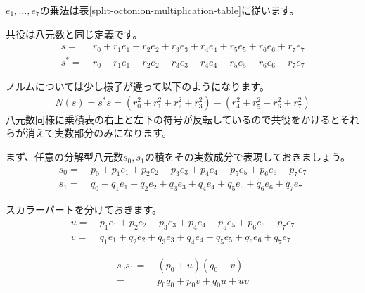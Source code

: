 \documentclass[a4paper,12pt,notitlepage]{jsreport}
\begin{document}
$e_1,...,e_7$の乗法は表\ref{split-octonion-multiplication-table}に従います。

共役は八元数と同じ定義です。
\begin{equation}
\begin{split}
s=~&r_0+r_1e_1+r_2e_2+r_3e_3+r_4e_4+r_5e_5+r_6e_6+r_7e_7\\
s^*=~&r_0-r_1e_1-r_2e_2-r_3e_3-r_4e_4-r_5e_5-r_6e_6-r_7e_7
\end{split}
\end{equation}

ノルムについては少し様子が違って以下のようになります。
\begin{equation}
\begin{split}
N(s)=s^*s=(r_0^2+r_1^2+r_2^2+r_3^2)-(r_4^2+r_5^2+r_6^2+r_7^2)
\end{split}
\end{equation}
八元数同様に乗積表の右上と左下の符号が反転しているので共役をかけるとそれらが消えて実数部分のみになります。

まず、任意の分解型八元数$s_0,s_1$の積をその実数成分で表現しておきましょう。
\begin{equation}
\begin{split}
s_0=~&p_0+p_1e_1+p_2e_2+p_3e_3+p_4e_4+p_5e_5+p_6e_6+p_7e_7\\
s_1=~&q_0+q_1e_1+q_2e_2+q_3e_3+q_4e_4+q_5e_5+q_6e_6+q_7e_7
\end{split}
\end{equation}

スカラーパートを分けておきます。
\begin{equation}
\begin{split}
u=~&p_1e_1+p_2e_2+p_3e_3+p_4e_4+p_5e_5+p_6e_6+p_7e_7\\
v=~&q_1e_1+q_2e_2+q_3e_3+q_4e_4+q_5e_5+q_6e_6+q_7e_7
\end{split}
\end{equation}

\begin{equation}
\begin{split}
s_0s_1=~&(p_0+u)(q_0+v)\\
=~&p_0q_0+p_0v+q_0u+uv
\end{split}
\end{equation}
\end{document}
